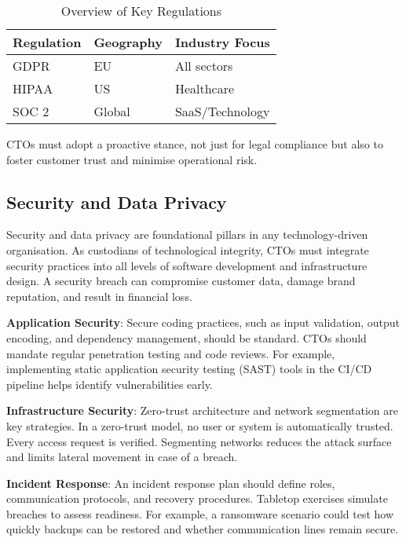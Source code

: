 \begin{table}[h!]
    \centering
    \begin{tabular}{|l|l|l|}
        \hline
        \textbf{Regulation} & \textbf{Geography} & \textbf{Industry Focus} \\
        \hline
        GDPR                & EU                 & All sectors             \\
        HIPAA               & US                 & Healthcare              \\
        SOC 2               & Global             & SaaS/Technology         \\
        \hline
    \end{tabular}
    \caption{Overview of Key Regulations}
    \label{tab:regulations}
\end{table}

CTOs must adopt a proactive stance, not just for legal compliance but also to foster customer trust and minimise operational risk.

\subsection{Security and Data Privacy}

Security and data privacy are foundational pillars in any technology-driven organisation. As custodians of technological integrity, CTOs must integrate security practices into all levels of software development and infrastructure design. A security breach can compromise customer data, damage brand reputation, and result in financial loss.

\textbf{Application Security}: Secure coding practices, such as input validation, output encoding, and dependency management, should be standard. CTOs should mandate regular penetration testing and code reviews. For example, implementing static application security testing (SAST) tools in the CI/CD pipeline helps identify vulnerabilities early.

\textbf{Infrastructure Security}: Zero-trust architecture and network segmentation are key strategies. In a zero-trust model, no user or system is automatically trusted. Every access request is verified. Segmenting networks reduces the attack surface and limits lateral movement in case of a breach.

\textbf{Incident Response}: An incident response plan should define roles, communication protocols, and recovery procedures. Tabletop exercises simulate breaches to assess readiness. For example, a ransomware scenario could test how quickly backups can be restored and whether communication lines remain secure.

